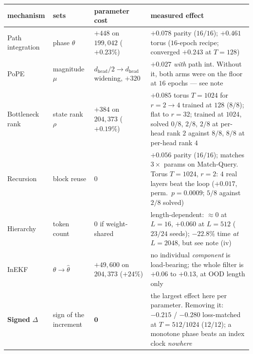 \documentclass[11pt]{article}
\newcommand{\hd}{d_{\mathrm{head}}}
\begin{document}
\begin{center}\small
\begin{tabular}{p{2.6cm}p{2.1cm}p{3.1cm}p{5.6cm}}
\toprule
mechanism & sets & parameter cost & measured effect \\
\midrule
Path integration & phase $\theta$ & $+448$ on $199{,}042$ ($+0.23\%$) & $+0.078$ parity ($16/16$); $+0.461$ torus ($16$-epoch recipe; converged $+0.243$ at $T{=}128$) \\[2pt]
PoPE             & magnitude $\mu$ & $\hd/2 \to \hd$ widening, $+320$ & $+0.027$ \emph{with} path int. Without it, both arms were on the floor at $16$ epochs --- see note \\[2pt]
Bottleneck rank  & state rank $\rho$ & $+384$ on $204{,}373$ ($+0.19\%$) & $+0.085$ torus $T{=}1024$ for $r{=}2\to4$ trained at $128$ ($8/8$); flat to $r{=}32$; trained at $1024$, solved $0/8$, $2/8$, $2/8$ at per-head rank $2$ against $8/8$, $8/8$ at per-head rank $4$ \\[2pt]
Recursion        & block reuse & $0$ & $+0.056$ parity ($16/16$); matches $3\times$ params on Match-Query. Torus $T{=}1024$, $r{=}2$: $4$ real layers beat the loop ($+0.017$, perm.\ $p=0.0009$; $5/8$ against $2/8$ solved) \\[2pt]
Hierarchy        & token count & $0$ if weight-shared & length-dependent: $\approx 0$ at $L=16$, $+0.060$ at $L=512$ ($23/24$ seeds); $-22.8\%$ time \emph{at $L=2048$}, but see note (iv) \\[2pt]
InEKF            & $\theta \to \hat\theta$ & $+49{,}600$ on $204{,}373$ ($+24\%$) & no individual \emph{component} is load-bearing; the whole filter is $+0.06$ to $+0.13$, at OOD length only \\[2pt]
\textbf{Signed} $\Delta$ & sign of the increment & $\mathbf{0}$ & the largest effect here per parameter. Removing it: $-0.215$ / $-0.280$ loss-matched at $T{=}512/1024$ ($12/12$); a monotone phase beats an index clock \emph{nowhere} \\
\bottomrule
\end{tabular}
\end{center}
\end{document}
